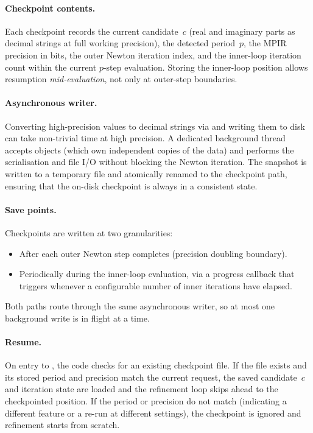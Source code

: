 \paragraph{Checkpoint contents.}
Each checkpoint records the current candidate~$c$ (real and imaginary
parts as decimal strings at full working precision), the detected
period~$p$, the MPIR precision in bits, the outer Newton iteration
index, and the inner-loop iteration count within the current $p$-step
evaluation.  Storing the inner-loop position allows resumption
\emph{mid-evaluation}, not only at outer-step boundaries.

\paragraph{Asynchronous writer.}
Converting high-precision  values to decimal strings via
 and writing them to disk can take non-trivial
time at high precision.  A dedicated  background
thread accepts  objects (which own independent
copies of the  data) and performs the serialisation and
file I/O without blocking the Newton iteration.  The snapshot is
written to a temporary file and atomically renamed to the checkpoint
path, ensuring that the on-disk checkpoint is always in a consistent
state.

\paragraph{Save points.}
Checkpoints are written at two granularities:
\begin{itemize}
  \item After each outer Newton step completes (precision doubling
        boundary).
  \item Periodically during the inner-loop evaluation, via a progress
        callback that triggers whenever a configurable number of
        inner iterations have elapsed.
\end{itemize}
Both paths route through the same asynchronous writer, so at most one
background write is in flight at a time.

\paragraph{Resume.}
On entry to , the code checks for an existing
checkpoint file.  If the file exists and its stored period and precision
match the current request, the saved candidate~$c$ and iteration state
are loaded and the refinement loop skips ahead to the checkpointed
position.  If the period or precision do not match (indicating a
different feature or a re-run at different settings), the checkpoint is
ignored and refinement starts from scratch.

